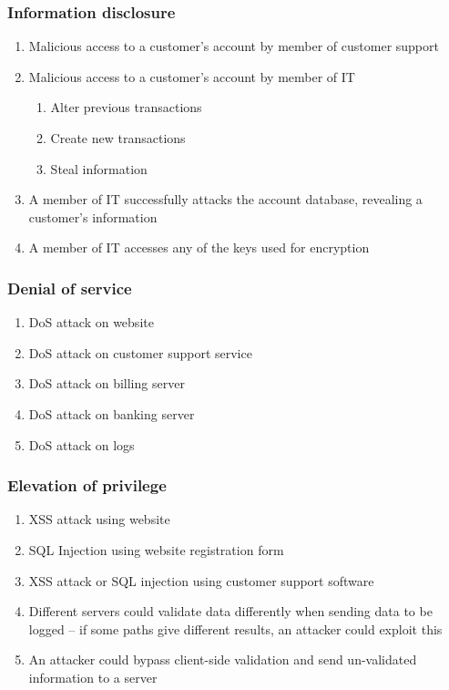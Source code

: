 \subsubsection{Information disclosure}

\begin{enumerate}[resume]
    \item Malicious access to a customer's account by member of customer support

    \item Malicious access to a customer's account by member of IT
    \begin{enumerate}
        \item Alter previous transactions
        \item Create new transactions
        \item Steal information
    \end{enumerate}

    \item A member of IT successfully attacks the account database, revealing a customer's information

    \item A member of IT accesses any of the keys used for encryption
\end{enumerate}

\subsubsection{Denial of service}

\begin{enumerate}[resume]
    \item DoS attack on website
    \item DoS attack on customer support service
    \item DoS attack on billing server
    \item DoS attack on banking server
    \item DoS attack on logs
\end{enumerate}

\subsubsection{Elevation of privilege}

\begin{enumerate}[resume]
    \item XSS attack using website
    \item SQL Injection using website registration form
    \item XSS attack or SQL injection using customer support software
    \item Different servers could validate data differently when sending data to be logged – if some paths give different results, an attacker could exploit this
    \item An attacker could bypass client-side validation and send un-validated information to a server
\end{enumerate}

